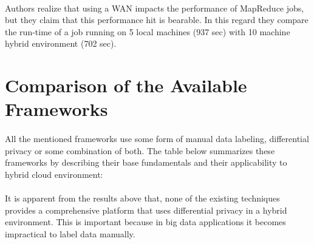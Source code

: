 \documentclass[12pt]{report}
\begin{document}
\paragraph{}
Authors realize that using a WAN impacts the performance of MapReduce jobs, but they claim that this performance hit is bearable. In this regard they compare the run-time of a job running on 5 local machines (937 sec) with 10 machine hybrid environment (702 sec).

\section{Comparison of the Available Frameworks}
\paragraph{}
All the mentioned frameworks use some form of manual data labeling, differential privacy or some combination of both. The table below summarizes these frameworks by describing their base fundamentals and their applicability to hybrid cloud environment:


\begin{table}[h]
\centering
\caption{Frameworks for privacy Oriented Analysis}
\label{Frameworks for privacy Oriented Analysis}
\end{table}
\paragraph{}
It is apparent from the results above that, none of the existing techniques provides a comprehensive platform that uses differential privacy in a hybrid environment. This is important because in big data applications it becomes impractical to label data manually.
\end{document}
